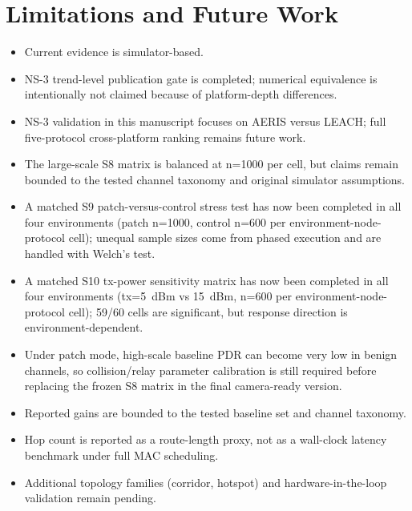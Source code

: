 \documentclass[sensors,article,submit,moreauthors,pdftex]{Definitions/mdpi}
\begin{document}
\section{Limitations and Future Work}
\begin{itemize}
\item Current evidence is simulator-based.
\item NS-3 trend-level publication gate is completed; numerical equivalence is intentionally not claimed because of platform-depth differences.
\item NS-3 validation in this manuscript focuses on AERIS versus LEACH; full five-protocol cross-platform ranking remains future work.
\item The large-scale S8 matrix is balanced at n=1000 per cell, but claims remain bounded to the tested channel taxonomy and original simulator assumptions.
\item A matched S9 patch-versus-control stress test has now been completed in all four environments (patch n=1000, control n=600 per environment-node-protocol cell); unequal sample sizes come from phased execution and are handled with Welch's test.
\item A matched S10 tx-power sensitivity matrix has now been completed in all four environments (tx=\SI{5}{dBm} vs \SI{15}{dBm}, n=600 per environment-node-protocol cell); 59/60 cells are significant, but response direction is environment-dependent.
\item Under patch mode, high-scale baseline PDR can become very low in benign channels, so collision/relay parameter calibration is still required before replacing the frozen S8 matrix in the final camera-ready version.
\item Reported gains are bounded to the tested baseline set and channel taxonomy.
\item Hop count is reported as a route-length proxy, not as a wall-clock latency benchmark under full MAC scheduling.
\item Additional topology families (corridor, hotspot) and hardware-in-the-loop validation remain pending.
\end{itemize}
\end{document}
